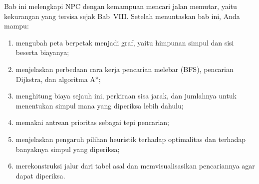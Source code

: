 \begin{tujuanbox}
Bab ini melengkapi NPC dengan kemampuan mencari jalan memutar, yaitu
kekurangan yang tersisa sejak Bab~VIII. Setelah menuntaskan bab ini, Anda
mampu:
\begin{enumerate}
  \item mengubah peta berpetak menjadi graf, yaitu himpunan simpul dan sisi
        beserta biayanya;
  \item menjelaskan perbedaan cara kerja pencarian melebar (BFS), pencarian
        Dijkstra, dan algoritma A*;
  \item menghitung biaya sejauh ini, perkiraan sisa jarak, dan jumlahnya untuk
        menentukan simpul mana yang diperiksa lebih dahulu;
  \item memakai antrean prioritas  sebagai tepi pencarian;
  \item menjelaskan pengaruh pilihan heuristik terhadap optimalitas dan
        terhadap banyaknya simpul yang diperiksa;
  \item merekonstruksi jalur dari tabel asal dan memvisualisasikan pencariannya
        agar dapat diperiksa.
\end{enumerate}
\end{tujuanbox}
